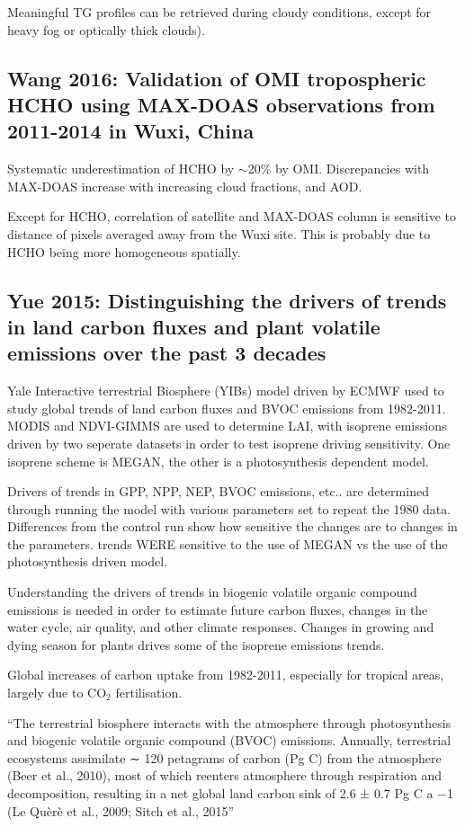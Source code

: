 \documentclass[11pt]{article} %
\begin{document}
    Meaningful TG profiles can be retrieved during cloudy conditions, except for heavy fog or optically thick clouds).
    
  \subsection{Wang 2016: Validation of OMI tropospheric HCHO using MAX-DOAS observations from 2011-2014 in Wuxi, China}
    \citet{Wang2016}
    Systematic underestimation of HCHO by $\sim$20\% by OMI.
    Discrepancies with MAX-DOAS increase with increasing cloud fractions, and AOD.
    
    Except for HCHO, correlation of satellite and MAX-DOAS column is sensitive to distance of pixels averaged away from the Wuxi site.
    This is probably due to HCHO being more homogeneous spatially.
    
  \subsection{Yue 2015: Distinguishing the drivers of trends in land carbon fluxes and plant
volatile emissions over the past 3 decades}
    \citet{Yue2015}
    Yale Interactive terrestrial Biosphere (YIBs) model driven by ECMWF used to study global trends of land carbon fluxes and BVOC emissions from 1982-2011.
    MODIS and NDVI-GIMMS are used to determine LAI, with isoprene emissions driven by two seperate datasets in order to test isoprene driving sensitivity.
    One isoprene scheme is MEGAN, the other is a photosynthesis dependent model.
    
    Drivers of trends in GPP, NPP, NEP, BVOC emissions, etc.. are determined through running the model with various parameters set to repeat the 1980 data.
    Differences from the control run show how sensitive the changes are to changes in the parameters.
    trends WERE sensitive to the use of MEGAN vs the use of the photosynthesis driven model.
    
    Understanding the drivers of trends in biogenic volatile organic compound emissions is needed in order to estimate future carbon fluxes, changes in the water cycle, air quality, and other climate responses.
    Changes in growing and dying season for plants drives some of the isoprene emissions trends.
    
    Global increases of carbon uptake from 1982-2011, especially for tropical areas, largely due to CO$_2$ fertilisation.
    
    ``The terrestrial biosphere interacts with the atmosphere through photosynthesis and biogenic volatile organic compound (BVOC) emissions. Annually, terrestrial ecosystems assimilate ∼ 120 petagrams of carbon (Pg C) from the atmosphere (Beer et al., 2010), most of which reenters atmosphere through respiration and decomposition, resulting in a net global land carbon sink of 2.6 ± 0.7 Pg C a −1 (Le Quèrè et al., 2009; Sitch et al., 2015''
    
\end{document}
